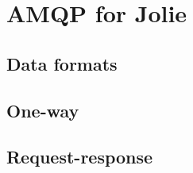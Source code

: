 \section{AMQP for Jolie}
\subsection{Data formats}
\subsection{One-way}
\subsection{Request-response}
\newpage